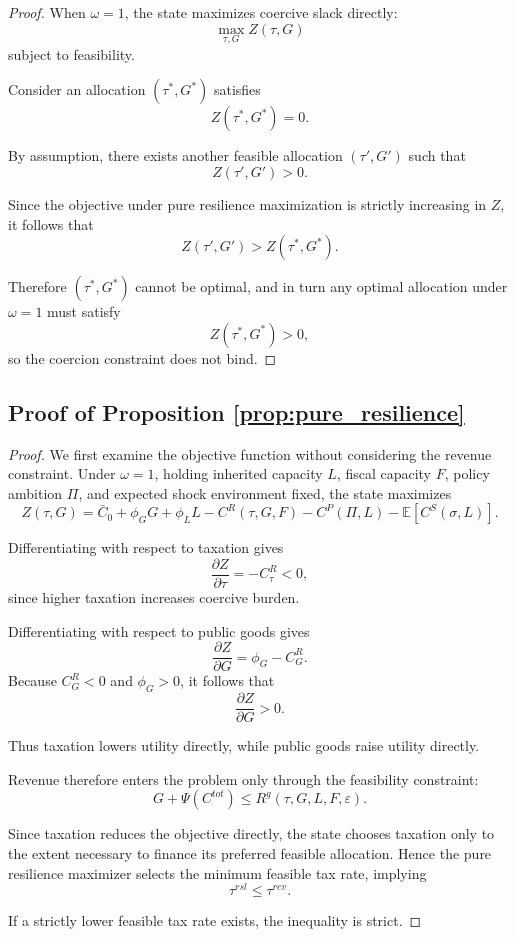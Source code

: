 \documentclass[12pt]{article}
\newcommand{\E}{\mathbb{E}}
\begin{document}
\begin{proof}
When \(\omega=1\), the state maximizes coercive slack directly:
\[
\max_{\tau,G} Z(\tau,G)
\]
subject to feasibility.

Consider an allocation \((\tau^*,G^*)\) satisfies
\[\label{eq:Ztaustar}
Z(\tau^*,G^*)=0.
\]

By assumption, there exists another feasible allocation \((\tau',G')\) such that
\[
Z(\tau',G')>0.
\]

Since the objective under pure resilience maximization is strictly increasing in \(Z\), it follows that
\[
Z(\tau',G') > Z(\tau^*,G^*).
\]

Therefore \((\tau^*,G^*)\) cannot be optimal, and in turn any optimal allocation under \(\omega=1\) must satisfy
\[
Z(\tau^*,G^*)>0,
\]
so the coercion constraint does not bind.
\end{proof}

\subsection{Proof of Proposition \ref{prop:pure_resilience}}

\begin{proof}
We first examine the objective function without considering the revenue constraint. Under $\omega=1$, holding inherited capacity $L$, fiscal capacity $F$, policy ambition $\Pi$, and expected shock environment fixed, the state maximizes
\[
Z(\tau,G)=\bar C_0 + \phi_G G + \phi_L L - C^R(\tau,G,F) - C^P(\Pi,L) - \E[C^S(\sigma,L)].
\]

Differentiating with respect to taxation gives
\[
\frac{\partial Z}{\partial \tau}=-C^R_\tau<0,
\]
since higher taxation increases coercive burden.

Differentiating with respect to public goods gives
\[
\frac{\partial Z}{\partial G}=\phi_G-C^R_G.
\]
Because $C^R_G<0$ and $\phi_G>0$, it follows that
\[
\frac{\partial Z}{\partial G}>0.
\]

Thus taxation lowers utility directly, while public goods raise utility directly.

Revenue therefore enters the problem only through the feasibility constraint:
\[
G+\Psi(C^{tot}) \le R^g(\tau,G,L,F,\varepsilon).
\]

Since taxation reduces the objective directly, the state chooses taxation only to the extent necessary to finance its preferred feasible allocation. Hence the pure resilience maximizer selects the minimum feasible tax rate, implying
\[
\tau^{rsl}\le \tau^{rev}.
\]

If a strictly lower feasible tax rate exists, the inequality is strict.
\end{proof}
\end{document}
